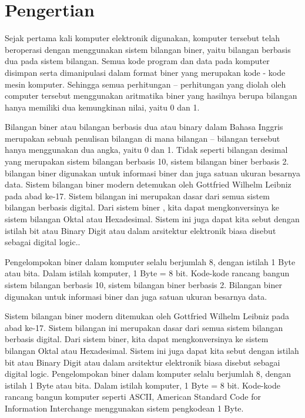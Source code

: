 \documentclass{article}
\begin{document}
\section{Pengertian} 


Sejak pertama kali komputer elektronik digunakan, komputer tersebut telah beroperasi dengan menggunakan sistem bilangan biner, yaitu bilangan berbasis dua pada sistem bilangan. Semua kode program dan data pada komputer disimpan serta dimanipulasi dalam format biner yang merupakan kode - kode mesin komputer. Sehingga semua perhitungan – perhitungan yang diolah oleh computer tersebut menggunakan aritmatika biner yang hasilnya berupa bilangan hanya memiliki dua kemungkinan nilai, yaitu 0 dan 1. 

Bilangan biner atau bilangan berbasis dua atau binary dalam Bahasa Inggris merupakan sebuah penulisan bilangan di mana bilangan – bilangan tersebut hanya menggunakan dua angka, yaitu 0 dan 1. Tidak seperti bilangan desimal yang merupakan sistem bilangan berbasis 10, sistem bilangan biner berbasis 2. bilangan biner digunakan untuk informasi biner dan juga satuan ukuran besarnya data. Sistem bilangan biner modern detemukan oleh Gottfried Wilhelm Leibniz pada abad ke-17. Sistem bilangan ini merupakan dasar dari semua sistem bilangan berbasis digital. Dari sistem biner , kita dapat mengkonversinya ke sistem bilangan Oktal atau Hexadesimal. Sistem ini juga dapat kita sebut dengan istilah bit atau Binary Digit atau dalam arsitektur elektronik biasa disebut sebagai digital logic.. 

Pengelompokan biner dalam komputer selalu berjumlah 8, dengan istilah 1 Byte atau bita. Dalam istilah komputer, 1 Byte = 8 bit. Kode-kode rancang bangun sistem bilangan berbasis 10, sistem bilangan biner berbasis 2. Bilangan biner digunakan untuk informasi biner dan juga satuan ukuran besarnya data.

Sistem bilangan biner modern ditemukan oleh Gottfried Wilhelm Leibniz pada abad ke-17. Sistem bilangan ini merupakan dasar dari semua sistem bilangan berbasis digital. Dari sistem biner, kita dapat mengkonversinya ke sistem bilangan Oktal atau Hexadesimal. Sistem ini juga dapat kita sebut dengan istilah bit atau Binary Digit atau dalam arsitektur elektronik biasa disebut sebagai digital logic. Pengelompokan biner dalam komputer selalu berjumlah 8, dengan istilah 1 Byte atau bita. Dalam istilah komputer, 1 Byte = 8 bit. Kode-kode rancang bangun komputer seperti ASCII, American Standard Code for Information Interchange menggunakan sistem pengkodean 1 Byte.
\end{document}
